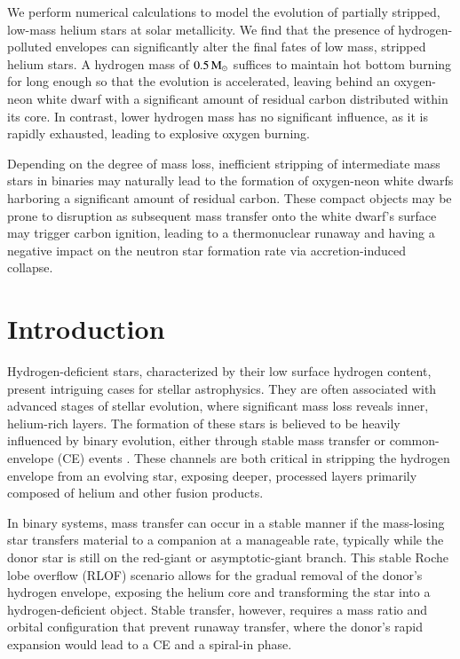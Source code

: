 \documentclass[main.tex]{subfiles}
\begin{document}
    We perform numerical calculations to model the evolution of partially stripped, low-mass helium stars at solar metallicity. 
    We find that the presence of hydrogen-polluted envelopes can significantly alter the final fates of low mass, stripped helium stars. A hydrogen mass of $0.5\mathrm{\,M_\odot}$ suffices to maintain hot bottom burning for long enough so that the evolution is accelerated, leaving behind an oxygen-neon white dwarf with a significant amount of residual carbon distributed within its core. In contrast, lower hydrogen mass has no significant influence, as it is rapidly exhausted, leading to explosive oxygen burning.

    Depending on the degree of mass loss, inefficient stripping of intermediate mass stars in binaries may naturally lead to the formation of oxygen-neon white dwarfs harboring a significant amount of residual carbon. These compact objects may be prone to disruption as subsequent mass transfer onto the white dwarf's surface may trigger carbon ignition, leading to a thermonuclear runaway and having a negative impact on the neutron star formation rate via accretion-induced collapse.
    
    
    {
        \minitoc
        \newpage
    }
    
    \section{Introduction} \label{sec:ch3:intro}
    Hydrogen-deficient stars, characterized by their low surface hydrogen content, present intriguing cases for stellar astrophysics. They are often associated with advanced stages of stellar evolution, where significant mass loss reveals inner, helium-rich layers. The formation of these stars is believed to be heavily influenced by binary evolution, either through stable mass transfer or common-envelope (CE) events \citep[e.g.,][]{2008ASPC..391..221D, 2008ASPC..391..323P}. These channels are both critical in stripping the hydrogen envelope from an evolving star, exposing deeper, processed layers primarily composed of helium and other fusion products.

    In binary systems, mass transfer can occur in a stable manner if the mass-losing star transfers material to a companion at a manageable rate, typically while the donor star is still on the red-giant or asymptotic-giant branch. This stable Roche lobe overflow (RLOF) scenario allows for the gradual removal of the donor’s hydrogen envelope, exposing the helium core and transforming the star into a hydrogen-deficient object. Stable transfer, however, requires a mass ratio and orbital configuration that prevent runaway transfer, where the donor’s rapid expansion would lead to a CE and a spiral-in phase. 
\end{document}
